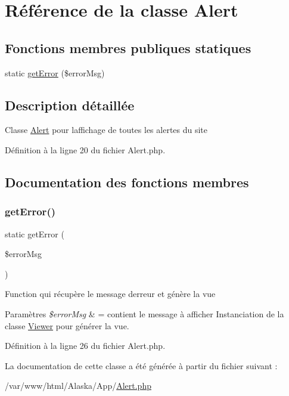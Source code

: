\hypertarget{class_app_1_1_alert}{}\section{Référence de la classe Alert}
\label{class_app_1_1_alert}
\subsection*{Fonctions membres publiques statiques}
\begin{DoxyCompactItemize}
\item 
static \hyperlink{class_app_1_1_alert_a9e9e1b0e1f542b18ea01e9f132a278e2}{get\+Error} (\$error\+Msg)
\end{DoxyCompactItemize}


\subsection{Description détaillée}
Classe \hyperlink{class_app_1_1_alert}{Alert} pour l\textquotesingle{}affichage de toutes les alertes du site 

Définition à la ligne 20 du fichier Alert.\+php.



\subsection{Documentation des fonctions membres}
\mbox{\label{class_app_1_1_alert_a9e9e1b0e1f542b18ea01e9f132a278e2}} 
\subsubsection{\texorpdfstring{get\+Error()}{getError()}}
{\footnotesize\ttfamily static get\+Error (\begin{DoxyParamCaption}\item[{}]{\$error\+Msg }\end{DoxyParamCaption})\hspace{0.3cm}{\ttfamily [static]}}

Function qui récupère le message d\textquotesingle{}erreur et génère la vue 
\begin{DoxyParams}{Paramètres}
{\em \$error\+Msg} & = contient le message à afficher Instanciation de la classe \hyperlink{class_app_1_1_viewer}{Viewer} pour générer la vue. \\
\hline
\end{DoxyParams}


Définition à la ligne 26 du fichier Alert.\+php.



La documentation de cette classe a été générée à partir du fichier suivant \+:\begin{DoxyCompactItemize}
\item 
/var/www/html/\+Alaska/\+App/\hyperlink{_alert_8php}{Alert.\+php}\end{DoxyCompactItemize}
